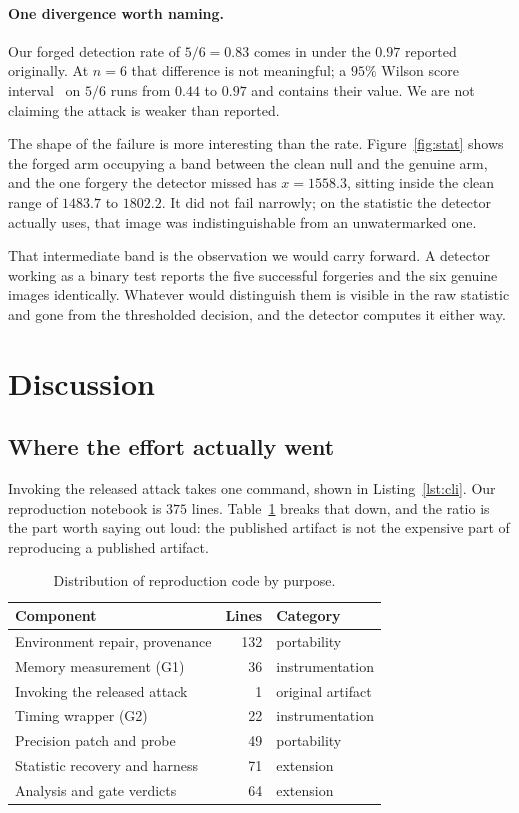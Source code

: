 \documentclass[10pt,twocolumn]{article}
\newcommand{\xstat}{\ensuremath{x}}
\begin{document}
\paragraph{One divergence worth naming.} Our forged detection rate of $5/6 = 0.83$
comes in under the $0.97$ reported originally. At $n = 6$ that difference is not
meaningful; a $95\%$ Wilson score interval~\cite{wilson1927interval} on $5/6$ runs from $0.44$ to $0.97$ and contains
their value. We are not claiming the attack is weaker than reported.

The shape of the failure is more interesting than the rate. Figure~\ref{fig:stat}
shows the forged arm occupying a band between the clean null and the genuine arm, and
the one forgery the detector missed has $\xstat = 1558.3$, sitting inside the clean
range of $1483.7$ to $1802.2$. It did not fail narrowly; on the statistic the detector
actually uses, that image was indistinguishable from an unwatermarked one.

That intermediate band is the observation we would carry forward. A detector working
as a binary test reports the five successful forgeries and the six genuine images
identically. Whatever would distinguish them is visible in the raw statistic and gone
from the thresholded decision, and the detector computes it either way.
\section{Discussion}
\label{sec:disc}

\subsection{Where the effort actually went}

Invoking the released attack takes one command, shown in Listing~\ref{lst:cli}. Our
reproduction notebook is $375$ lines. Table~\ref{tab:effort} breaks that down, and the
ratio is the part worth saying out loud: the published artifact is not the expensive
part of reproducing a published artifact.

\begin{table}[t]
\centering\small
\caption{Distribution of reproduction code by purpose.}
\label{tab:effort}
\begin{tabular}{lrl}
\toprule
Component & Lines & Category \\
\midrule
Environment repair, provenance & 132 & portability \\
Memory measurement (G1)        & 36  & instrumentation \\
Invoking the released attack   & 1   & original artifact \\
Timing wrapper (G2)            & 22  & instrumentation \\
Precision patch and probe      & 49  & portability \\
Statistic recovery and harness & 71  & extension \\
Analysis and gate verdicts     & 64  & extension \\
\bottomrule
\end{tabular}
\end{table}
\end{document}
